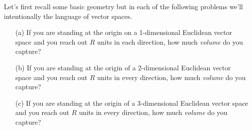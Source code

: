 \begin{problem}
    Let's first recall some basic geometry but in each of the following problems we'll
    intentionally the language of vector spaces.
    \begin{enumerate}
        \item[(a)] If you are standing at the origin on a 1-dimensional Euclidean vector
            space and you reach out $R$ units in each direction, how much {\it volume} do
            you capture? 
        \item[(b)] If you are standing at the origin of a 2-dimensional Euclidean vector
            space and you reach out $R$ units in every direction, how much {\it volume} do
            you capture?
        \item[(c)] If you are standing at the origin of a 3-dimensional Euclidean vector
            space and you reach out $R$ units in every direction, how much {\it volume} do
            you capture?

    \end{enumerate}
\end{problem}

